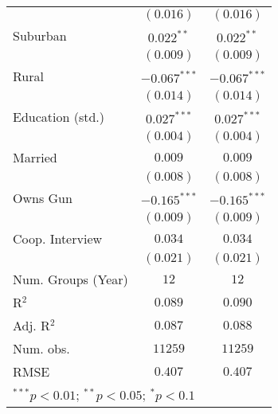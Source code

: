 \begin{table}
\begin{center}
\begin{tabular}{l c c}
                        & $(0.016)$      & $(0.016)$      \\
Suburban                & $0.022^{**}$   & $0.022^{**}$   \\
                        & $(0.009)$      & $(0.009)$      \\
Rural                   & $-0.067^{***}$ & $-0.067^{***}$ \\
                        & $(0.014)$      & $(0.014)$      \\
Education (std.)        & $0.027^{***}$  & $0.027^{***}$  \\
                        & $(0.004)$      & $(0.004)$      \\
Married                 & $0.009$        & $0.009$        \\
                        & $(0.008)$      & $(0.008)$      \\
Owns Gun                & $-0.165^{***}$ & $-0.165^{***}$ \\
                        & $(0.009)$      & $(0.009)$      \\
Coop. Interview         & $0.034$        & $0.034$        \\
                        & $(0.021)$      & $(0.021)$      \\
\midrule
Num. Groups (Year)      & $12$           & $12$           \\
R$^2$                   & $0.089$        & $0.090$        \\
Adj. R$^2$              & $0.087$        & $0.088$        \\
Num. obs.               & $11259$        & $11259$        \\
RMSE                    & $0.407$        & $0.407$        \\
\bottomrule
\multicolumn{3}{l}{\scriptsize{$^{***}p<0.01$; $^{**}p<0.05$; $^{*}p<0.1$}}
\end{tabular}
\label{table_ate_alt_party_coding}
\end{center}
\end{table}
